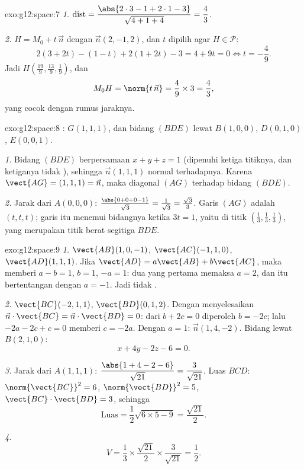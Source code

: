 \begin{solution}{exo:g12:space:7}
\emph{1.} $\operatorname{dist} = \dfrac{\abs{2\cdot3 - 1 + 2\cdot1 - 3}}
{\sqrt{4 + 1 + 4}} = \dfrac{4}{3}$.

\emph{2.} $H = M_0 + t\,\vec n$ dengan $\vec n(2, -1, 2)$, dan $t$ dipilih agar
$H \in \mathcal P$:
\[
2(3 + 2t) - (1 - t) + 2(1 + 2t) - 3 = 4 + 9t = 0 \iff t = -\frac49 .
\]
Jadi $H\left(\frac{19}{9}, \frac{13}{9}, \frac19\right)$, dan
\[
M_0H = \norm{t\,\vec n} = \frac49 \times 3 = \frac43,
\]
yang cocok dengan rumus jaraknya.
\end{solution}

\begin{solution}{exo:g12:space:8}
: $G(1,1,1)$, dan bidang $(BDE)$ lewat $B(1,0,0)$,
$D(0,1,0)$, $E(0,0,1)$.

\emph{1.} Bidang $(BDE)$ berpersamaan $x + y + z = 1$ (dipenuhi ketiga
titiknya, dan ketiganya tidak ), sehingga $\vec n(1,1,1)$ normal
terhadapnya. Karena $\vect{AG} = (1,1,1) = \vec n$, maka diagonal $(AG)$ 
terhadap bidang $(BDE)$.

\emph{2.} Jarak dari $A(0,0,0)$:
$\frac{\abs{0 + 0 + 0 - 1}}{\sqrt3} = \frac{1}{\sqrt3} = \frac{\sqrt3}{3}$.
Garis $(AG)$ adalah $(t, t, t)$; garis itu menemui bidangnya ketika $3t = 1$, yaitu di
titik $\left(\frac13, \frac13, \frac13\right)$, yang merupakan titik berat
segitiga $BDE$.
\end{solution}

\begin{solution}{exo:g12:space:9}
\emph{1.} $\vect{AB}(1, 0, -1)$, $\vect{AC}(-1, 1, 0)$,
$\vect{AD}(1, 1, 1)$. Jika $\vect{AD} = a\vect{AB} + b\vect{AC}$, maka
 memberi $a - b = 1$, $b = 1$, $-a = 1$: dua yang pertama memaksa
$a = 2$, dan itu bertentangan dengan $a = -1$. Jadi tidak .

\emph{2.} $\vect{BC}(-2, 1, 1)$, $\vect{BD}(0, 1, 2)$. Dengan menyelesaikan
$\vec n \cdot \vect{BC} = \vec n \cdot \vect{BD} = 0$: dari
$b + 2c = 0$ diperoleh $b = -2c$; lalu $-2a - 2c + c = 0$ memberi $c = -2a$. Dengan
$a = 1$: $\vec n(1, 4, -2)$. Bidang lewat $B(2,1,0)$:
\[
x + 4y - 2z - 6 = 0 .
\]

\emph{3.} Jarak dari $A(1,1,1)$:
$\dfrac{\abs{1 + 4 - 2 - 6}}{\sqrt{21}} = \dfrac{3}{\sqrt{21}}$.
Luas $BCD$: $\norm{\vect{BC}}^2 = 6$, $\norm{\vect{BD}}^2 = 5$,
$\vect{BC}\cdot\vect{BD} = 3$, sehingga
\[
\text{Luas} = \frac12\sqrt{6 \times 5 - 9} = \frac{\sqrt{21}}{2}.
\]

\emph{4.}
\[
V = \frac13 \times \frac{\sqrt{21}}{2} \times \frac{3}{\sqrt{21}}
= \frac12 .
\]
\end{solution}

